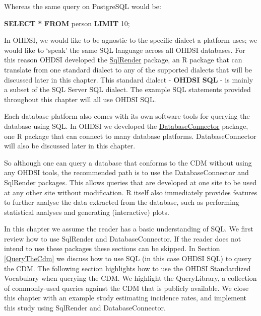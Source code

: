 \documentclass[11pt]{book}
\newenvironment{Shaded}{\begin{snugshade}}{\end{snugshade}}
\newcommand{\DecValTok}[1]{\textcolor[rgb]{0.00,0.00,0.81}{#1}}
\newcommand{\KeywordTok}[1]{\textcolor[rgb]{0.13,0.29,0.53}{\textbf{#1}}}
\newcommand{\NormalTok}[1]{#1}
\newcommand{\OperatorTok}[1]{\textcolor[rgb]{0.81,0.36,0.00}{\textbf{#1}}}
\theoremstyle{definition}
\theoremstyle{definition}
\theoremstyle{definition}
\theoremstyle{remark}
\begin{document}
Whereas the same query on PostgreSQL would be:

\begin{Shaded}
\begin{Highlighting}[]
\KeywordTok{SELECT} \OperatorTok{*} \KeywordTok{FROM}\NormalTok{ person }\KeywordTok{LIMIT} \DecValTok{10}\NormalTok{;}
\end{Highlighting}
\end{Shaded}

In OHDSI, we would like to be agnostic to the specific dialect a platform uses; we would like to `speak' the same SQL language across all OHDSI databases. For this reason OHDSI developed the \href{https://ohdsi.github.io/SqlRender/}{SqlRender} package, an R package that can translate from one standard dialect to any of the supported dialects that will be discussed later in this chapter. This standard dialect - \textbf{OHDSI SQL} - is mainly a subset of the SQL Server SQL dialect. The example SQL statements provided throughout this chapter will all use OHDSI SQL.    

Each database platform also comes with its own software tools for querying the database using SQL. In OHDSI we developed the \href{https://ohdsi.github.io/DatabaseConnector/}{DatabaseConnector} package, one R package that can connect to many database platforms. DatabaseConnector will also be discussed later in this chapter. 

So although one can query a database that conforms to the CDM without using any OHDSI tools, the recommended path is to use the DatabaseConnector and SqlRender packages. This allows queries that are developed at one site to be used at any other site without modification. R itself also immediately provides features to further analyse the data extracted from the database, such as performing statistical analyses and generating (interactive) plots. 

In this chapter we assume the reader has a basic understanding of SQL. We first review how to use SqlRender and DatabaseConnector. If the reader does not intend to use these packages these sections can be skipped. In Section \ref{QueryTheCdm} we discuss how to use SQL (in this case OHDSI SQL) to query the CDM. The following section highlights how to use the OHDSI Standardized Vocabulary when querying the CDM. We highlight the QueryLibrary, a collection of commonly-used queries against the CDM that is publicly available. We close this chapter with an example study estimating incidence rates, and implement this study using SqlRender and DatabaseConnector.  
\end{document}
